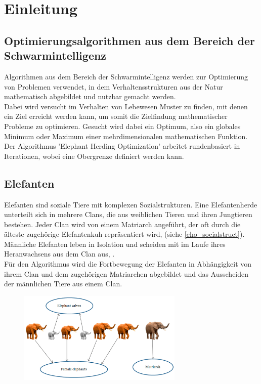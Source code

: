 \chapter{Einleitung}

\section{Optimierungsalgorithmen aus dem Bereich der Schwarmintelligenz}
Algorithmen aus dem Bereich der Schwarmintelligenz werden zur Optimierung von Problemen verwendet, in dem Verhaltensstrukturen aus der Natur mathematisch abgebildet und nutzbar gemacht werden.\\
Dabei wird versucht im Verhalten von Lebewesen Muster zu finden, mit denen ein Ziel erreicht werden kann, um somit die Zielfindung mathematischer Probleme zu optimieren. Gesucht wird dabei ein Optimum, also ein globales Minimum oder Maximum einer mehrdimensionalen mathematischen Funktion.\\
Der Algorithmus 'Elephant Herding Optimization' arbeitet rundenbasiert in Iterationen, wobei eine Obergrenze definiert werden kann.

\section{Elefanten} 
Elefanten sind soziale Tiere mit komplexen Sozialstrukturen. Eine Elefantenherde unterteilt sich in mehrere Clans, die aus weiblichen Tieren und ihren Jungtieren bestehen. Jeder Clan wird von einem Matriarch angeführt, der oft durch die älteste zugehörige Elefantenkuh repräsentiert wird, (siehe \autoref{eho_socialstruct}). Männliche Elefanten leben in Isolation und scheiden mit im Laufe ihres Heranwachsens aus dem Clan aus, \cite[vgl. Wang et al. 2015, S.1]{wang_deb_coelho_2015}. \\
Für den Algorithmus wird die Fortbewegung der Elefanten in Abhängigkeit von ihrem Clan und dem zugehörigen Matriarchen abgebildet und das Ausscheiden der männlichen Tiere aus einem Clan. 

\begin{figure}[ht]
    \begin{center}
        \includegraphics[width=0.7\textwidth]{assets/img/eho_socialstruct.png}
        \caption[EHO Social Structure in a clan]{\cite[Li et al, S.3]{li_lei_alavi_wang_2020}}
        \label{eho_socialstruct}
    \end{center}
\end{figure}